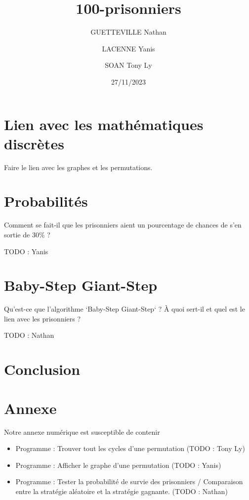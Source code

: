 \documentclass[a4paper]{article}
\title{100-prisonniers}
\date{27/11/2023}
\author{GUETTEVILLE Nathan}
\author{LACENNE Yanis}
\author{SOAN Tony Ly}
\affil{G4S12}
\begin{document}
\maketitle


\tableofcontents

\newpage


\section{Lien avec les mathématiques discrètes}
Faire le lien avec les graphes et les permutations.

\section{Probabilités}
Comment se fait-il que les prisonniers aient un pourcentage de chances de s'en sortie de 30\% ?

TODO : Yanis

\section{Baby-Step Giant-Step}
Qu'est-ce que l'algorithme `Baby-Step Giant-Step` ? À quoi sert-il et quel est le lien avec les prisonniers ?

TODO : Nathan

\section{Conclusion}

\section{Annexe}
Notre annexe numérique est susceptible de contenir
\begin{itemize}
	\item Programme : Trouver tout les cycles d'une permutation
	      (TODO : Tony Ly)
	\item Programme : Afficher le graphe d'une permutation
	      (TODO : Yanis)
	\item Programme : Tester la probabilité de survie des prisonniers / Comparaison entre la stratégie aléatoire et la stratégie gagnante.
	      (TODO : Nathan)
\end{itemize}
\end{document}
